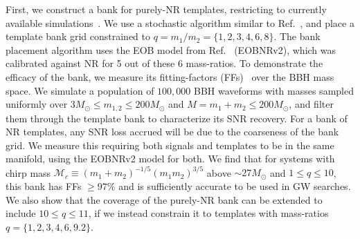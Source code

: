 First, we construct a bank for purely-NR templates, restricting to
currently available simulations~\cite{MacDonald:2012mp,Mroue:2012kv,
Buchman:2012dw,Mroue:2013xna,Mroue:2012kv}. We use a stochastic algorithm 
similar to Ref.~\cite{Harry:2009ea,Ajith:2012mn,Manca:2009xw}, 
and place a template bank grid
constrained to $q=m_1/m_2=\{1,2,3,4,6,8\}$. The bank placement 
algorithm uses the EOB model from Ref.~\cite{BuonannoEOBv2Main} (EOBNRv2), 
which was calibrated against NR for 5 out of these 6 mass-ratios. 
To demonstrate the efficacy of the 
bank, we measure its fitting-factors (FFs)~\cite{FittingFactorApostolatos} over
the BBH mass space. We simulate a population of $100,000$ BBH waveforms with
masses sampled uniformly over 
$3M_\odot\leq m_{1,2}\leq 200M_\odot$ and $M=m_1+m_2\leq 200M_\odot$, and filter
them through the template bank to characterize its SNR recovery. For a
bank of NR templates, any SNR loss accrued will be due to the coarseness
of the bank grid. We measure this requiring both signals and templates
to be in the same manifold, using the EOBNRv2 model for both. We find 
that for systems with chirp mass 
$\mathcal{M}_c \equiv (m_1 + m_2)^{-1/5} (m_1 m_2)^{3/5}$ above 
$\sim 27M_{\odot}$ and $1\leq q\leq 10$, this bank has FFs $\geq 97\%$ and
is sufficiently accurate to be used in GW searches.
We also show that the coverage of the purely-NR bank can be extended to
include $10\leq q\leq 11$, if we instead constrain it to templates with
mass-ratios $q=\{1,2,3,4,6,9.2\}$.

